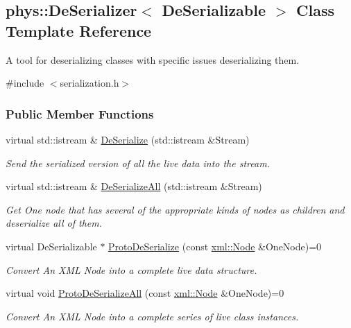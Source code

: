\hypertarget{classphys_1_1DeSerializer}{
\subsection{phys::DeSerializer$<$ DeSerializable $>$ Class Template Reference}
\label{classphys_1_1DeSerializer}
}


A tool for deserializing classes with specific issues deserializing them.  




{\ttfamily \#include $<$serialization.h$>$}

\subsubsection*{Public Member Functions}
\begin{DoxyCompactItemize}
\item 
virtual std::istream \& \hyperlink{classphys_1_1DeSerializer_a305c2b21d7637da1be75fbb669c85b1c}{DeSerialize} (std::istream \&Stream)
\begin{DoxyCompactList}\small\item\em Send the serialized version of all the live data into the stream. \item\end{DoxyCompactList}\item 
virtual std::istream \& \hyperlink{classphys_1_1DeSerializer_ab0f45958eb28b72bac85d1c08f413753}{DeSerializeAll} (std::istream \&Stream)
\begin{DoxyCompactList}\small\item\em Get One node that has several of the appropriate kinds of nodes as children and deserialize all of them. \item\end{DoxyCompactList}\item 
virtual DeSerializable $\ast$ \hyperlink{classphys_1_1DeSerializer_a27bd2326bf5b74a0587a6d5ee3a9d690}{ProtoDeSerialize} (const \hyperlink{classphys_1_1xml_1_1Node}{xml::Node} \&OneNode)=0
\begin{DoxyCompactList}\small\item\em Convert An XML Node into a complete live data structure. \item\end{DoxyCompactList}\item 
virtual void \hyperlink{classphys_1_1DeSerializer_a22bf7e17185f735f36ddd4a93c2e5168}{ProtoDeSerializeAll} (const \hyperlink{classphys_1_1xml_1_1Node}{xml::Node} \&OneNode)=0
\begin{DoxyCompactList}\small\item\em Convert An XML Node into a complete series of live class instances. \item\end{DoxyCompactList}\end{DoxyCompactItemize}


